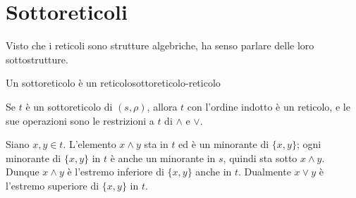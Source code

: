 \section{Sottoreticoli}\label{sec:sottoreticoli}

Visto che i reticoli sono strutture algebriche, ha senso parlare delle loro sottostrutture.


\begin{concetto}
\begin{Proposizione}{Un sottoreticolo è un reticolo}{sottoreticolo-reticolo}
    \begin{prerequisiti}
    \end{prerequisiti}
    Se $t$ è un sottoreticolo di $(s, \rho)$, allora $t$ con l'ordine indotto è un reticolo, e le sue operazioni sono le restrizioni a $t$ di $\wedge$ e $\vee$.
\end{Proposizione}
\begin{dimostrazione}
    Siano $x, y \in t$. L'elemento $x \wedge y$ sta in $t$ ed è un minorante di $\{x, y\}$; ogni minorante di $\{x, y\}$ in $t$ è anche un minorante in $s$, quindi
    sta sotto $x \wedge y$. Dunque $x \wedge y$ è l'estremo inferiore di $\{x, y\}$ anche in $t$. Dualmente $x \vee y$ è l'estremo superiore di $\{x, y\}$ in $t$.
\end{dimostrazione}
\end{concetto}

